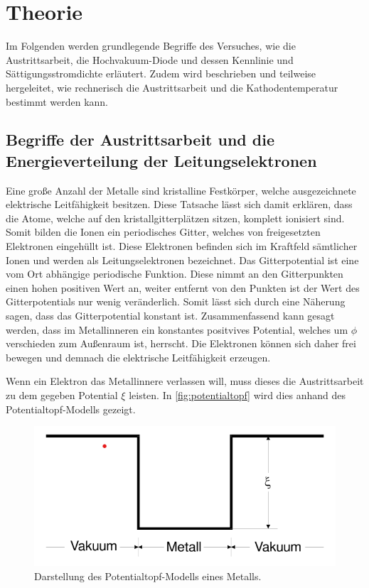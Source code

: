 \section{Theorie}
\label{sec:theorie}

Im Folgenden werden grundlegende Begriffe des Versuches, wie die Austrittsarbeit, die Hochvakuum-Diode und dessen Kennlinie und Sättigungsstromdichte erläutert.
Zudem wird beschrieben und teilweise hergeleitet, wie rechnerisch die Austrittsarbeit und die Kathodentemperatur bestimmt werden kann.

\subsection{Begriffe der Austrittsarbeit und die Energieverteilung der Leitungselektronen}
\label{sec:Begriffe der Austrittsarbeit und die Energieverteilung der Leitungselektronen}

Eine große Anzahl der Metalle sind kristalline Festkörper, welche ausgezeichnete elektrische Leitfähigkeit besitzen.
Diese Tatsache lässt sich damit erklären, dass die Atome, welche auf den kristallgitterplätzen sitzen, komplett ionisiert sind.
Somit bilden die Ionen ein periodisches Gitter, welches von freigesetzten Elektronen eingehüllt ist.
Diese Elektronen befinden sich im Kraftfeld sämtlicher Ionen und werden als Leitungselektronen bezeichnet.
Das Gitterpotential ist eine vom Ort abhängige periodische Funktion. Diese nimmt an den Gitterpunkten einen hohen positiven Wert an,
weiter entfernt von den Punkten ist der Wert des Gitterpotentials nur wenig veränderlich. Somit lässt sich durch eine
Näherung sagen, dass das Gitterpotential konstant ist. Zusammenfassend kann gesagt werden, dass im Metallinneren ein konstantes 
positvives Potential, welches um $\phi$ verschieden zum Außenraum ist, herrscht. Die Elektronen können sich daher 
frei bewegen und demnach die elektrische Leitfähigkeit erzeugen.

Wenn ein Elektron das Metallinnere verlassen will, muss dieses die Austrittsarbeit zu dem gegeben Potential $\xi$ leisten.
In \autoref{fig:potentialtopf} wird dies anhand des Potentialtopf-Modells gezeigt.
\begin{figure}[H]
    \centering
    \includegraphics[width=0.5\linewidth]{content/grafik/potential.png}
    \caption{Darstellung des Potentialtopf-Modells eines Metalls.\cite{elektron}}
    \label{fig:potentialtopf}
\end{figure}

